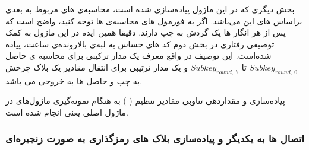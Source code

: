 بخش دیگری که در این ماژول پیاده‌سازی شده است، محاسبه‌ی 
های مربوط به
 بعدی براساس 
 های این 
  می‌باشد.
  اگر به فورمول های محاسبه‌ی
  ها توجه کنید، واضح است که پس از هر 
   انگار  
   ها یک گردش به چپ دارند. دقیقا همین ایده در این ماژول به کمک توصیفی رفتاری در بخش دوم کد های 
   حساس به لبه‌ی بالارونده‌ی ساعت، پیاده شده‌است. این توصیف در واقع معرف یک مدار ترکیبی برای محاسبه ی حاصل 
   $Subkey_{round,\ 0}$
   تا
$Subkey_{round,\ 7}$
و یک مدار ترتیبی برای انتقال مقادیر یک بلاک چرخش به چپ و حاصل 
ها به خروجی می باشد.

پیاده‌سازی و مقدار‌دهی تناوبی مقادیر تنظیم (
)
به هنگام نمونه‌گیری ماژول‌های 
در ماژول اصلی یعنی
انجام شده است.

\subsubsection{
	اتصال 
	ها به یکدیگر و پیاده‌سازی بلاک های رمزگذاری به صورت زنجیره‌ای
}
